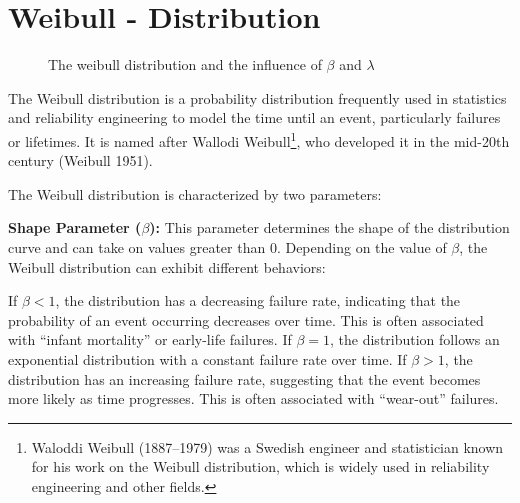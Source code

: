 \documentclass[
  a4paper,
]{scrbook}
\begin{document}
\section{Weibull - Distribution}\label{weibull---distribution}

\begin{figure}[ht]


\caption{\label{fig-wbll-dist}The weibull distribution and the influence
of \(\beta\) and \(\lambda\)}

\end{figure}%

The Weibull distribution is a probability distribution frequently used
in statistics and reliability engineering to model the time until an
event, particularly failures or lifetimes. It is named after Wallodi
Weibull\footnote{Waloddi Weibull (1887--1979) was a Swedish engineer and
  statistician known for his work on the Weibull distribution, which is
  widely used in reliability engineering and other fields.}, who
developed it in the mid-20th century (Weibull 1951).

The Weibull distribution is characterized by two parameters:

\textbf{Shape Parameter (\(\beta\)):} This parameter determines the
shape of the distribution curve and can take on values greater than 0.
Depending on the value of \(\beta\), the Weibull distribution can
exhibit different behaviors:

If \(\beta < 1\), the distribution has a decreasing failure rate,
indicating that the probability of an event occurring decreases over
time. This is often associated with ``infant mortality'' or early-life
failures. If \(\beta = 1\), the distribution follows an exponential
distribution with a constant failure rate over time. If \(\beta > 1\),
the distribution has an increasing failure rate, suggesting that the
event becomes more likely as time progresses. This is often associated
with ``wear-out'' failures.
\end{document}

